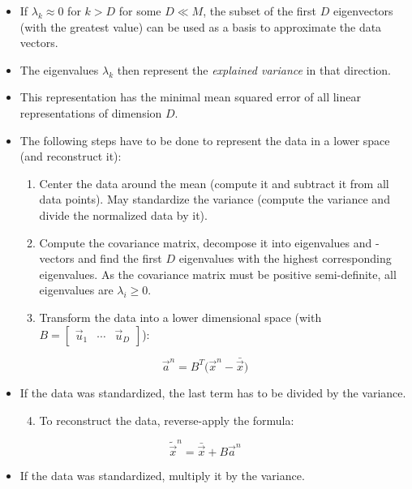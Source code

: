 			\begin{itemize}
				\item If \( \lambda_k \approx 0 \) for \( k > D \) for some \( D \ll M \), the subset of the first \(D\) eigenvectors (with the greatest value) can be used as a basis to approximate the data vectors.
				\item The eigenvalues \(\lambda_k\) then represent the \emph{explained variance} in that direction.
				\item This representation has the minimal mean squared error of all linear representations of dimension \(D\).
				\item The following steps have to be done to represent the data in a lower space (and reconstruct it):
					\begin{enumerate}
						\item Center the data around the mean (compute it and subtract it from all data points). May standardize the variance (compute the variance and divide the normalized data by it).
						\item Compute the covariance matrix, decompose it into eigenvalues and -vectors and find the first \(D\) eigenvalues with the highest corresponding eigenvalues. As the covariance matrix must be positive semi-definite, all eigenvalues are \( \lambda_i \geq 0 \).
						\item Transform the data into a lower dimensional space (with \( B = \begin{bmatrix} \vec{u}_1 & \cdots & \vec{u}_D \end{bmatrix} \)):
					\end{enumerate}
			\end{itemize}
			\begin{equation}
				\vec{a}^n = B^T \big( \vec{x}^n - \bar{\vec{x}} \big)
			\end{equation}
			\begin{itemize}
				\item[] If the data was standardized, the last term has to be divided by the variance.
					\begin{enumerate}
						\setcounter{enumi}{3}
						\item To reconstruct the data, reverse-apply the formula:
					\end{enumerate}
			\end{itemize}
			\begin{equation}
				\tilde{\vec{x}}^n = \bar{\vec{x}} + B \vec{a}^n
			\end{equation}
			\begin{itemize}
				\item[] If the data was standardized, multiply it by the variance.
			\end{itemize}

